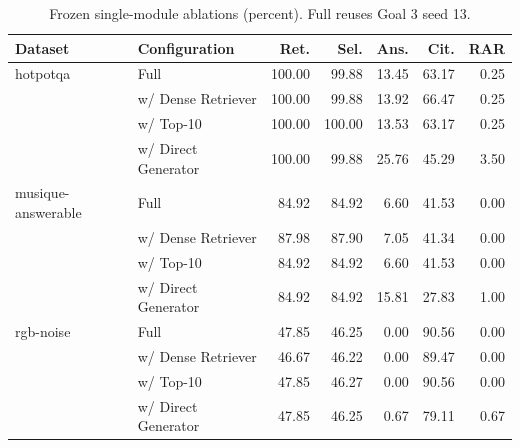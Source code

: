 \begin{table}[t]
\centering
\caption{Frozen single-module ablations (percent). Full reuses Goal 3 seed 13.}
\label{tab:experiment04-ablation}
\begin{tabular}{llrrrrr}
\toprule
Dataset & Configuration & Ret. & Sel. & Ans. & Cit. & RAR \\
\midrule
hotpotqa & Full & 100.00 & 99.88 & 13.45 & 63.17 & 0.25 \\
 & w/ Dense Retriever & 100.00 & 99.88 & 13.92 & 66.47 & 0.25 \\
 & w/ Top-10 & 100.00 & 100.00 & 13.53 & 63.17 & 0.25 \\
 & w/ Direct Generator & 100.00 & 99.88 & 25.76 & 45.29 & 3.50 \\
\midrule
musique-answerable & Full & 84.92 & 84.92 & 6.60 & 41.53 & 0.00 \\
 & w/ Dense Retriever & 87.98 & 87.90 & 7.05 & 41.34 & 0.00 \\
 & w/ Top-10 & 84.92 & 84.92 & 6.60 & 41.53 & 0.00 \\
 & w/ Direct Generator & 84.92 & 84.92 & 15.81 & 27.83 & 1.00 \\
\midrule
rgb-noise & Full & 47.85 & 46.25 & 0.00 & 90.56 & 0.00 \\
 & w/ Dense Retriever & 46.67 & 46.22 & 0.00 & 89.47 & 0.00 \\
 & w/ Top-10 & 47.85 & 46.27 & 0.00 & 90.56 & 0.00 \\
 & w/ Direct Generator & 47.85 & 46.25 & 0.67 & 79.11 & 0.67 \\
\bottomrule
\end{tabular}
\end{table}
